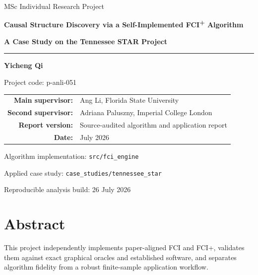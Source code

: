 \documentclass[11pt,a4paper,oneside]{report}
\newcommand{\FCIplus}{FCI\textsuperscript{+}}
\newcommand{\code}[1]{\texttt{#1}}
\begin{document}
\hypersetup{pageanchor=false}
\begin{titlepage}
  \centering
  \vspace*{1.4cm}
  {\Large MSc Individual Research Project\par}
  \vspace{1.2cm}
  {\Huge\bfseries\color{ReportNavy}
  Causal Structure Discovery via a Self-Implemented \FCIplus{} Algorithm\par}
  \vspace{0.45cm}
  {\LARGE\bfseries\color{ReportGreen}
  A Case Study on the Tennessee STAR Project\par}
  \vspace{1.5cm}
  \rule{0.82\textwidth}{0.8pt}
  \vspace{1.1cm}

  {\Large\textbf{Yicheng Qi}\par}
  \vspace{0.25cm}
  {\large Project code: p-anli-051\par}
  \vspace{1.1cm}

  \begin{tabular}{rl}
    \textbf{Main supervisor:} & Ang Li, Florida State University \\
    \textbf{Second supervisor:} & Adriana Paluszny, Imperial College London \\
    \textbf{Report version:} & Source-audited algorithm and application report \\
    \textbf{Date:} & July 2026
  \end{tabular}

  \vfill
  {\small
  Algorithm implementation: \code{src/fci\_engine}\par
  Applied case study: \code{case\_studies/tennessee\_star}\par
  Reproducible analysis build: 26 July 2026\par}
\end{titlepage}

\hypersetup{pageanchor=true}

\chapter*{Abstract}

This project independently implements paper-aligned FCI and FCI+, validates
them against exact graphical oracles and established software, and separates
algorithm fidelity from a robust finite-sample application workflow.
\end{document}
